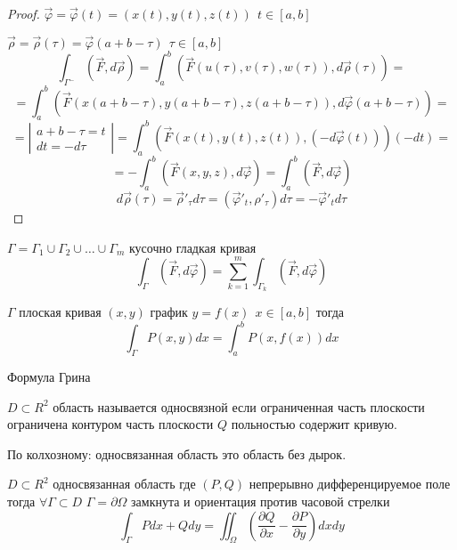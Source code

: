 \begin{proof}
  $\vec \varphi = \vec \varphi(t) = (x(t), y(t), z(t)) ~~ t \in [a,b]$

  $\vec \rho = \vec \rho (\tau) = \vec \varphi(a+b-\tau) ~~ \tau \in [a,b]$
  $$
  \int_{\Gamma^-}(\vec F, d\vec \rho) = \int_a^b (\vec F(u(\tau), v(\tau),
  w(\tau)), d\vec \rho (\tau)) =
  $$
  $$
  = \int_a^b (\vec F(x(a+b-\tau),y(a+b-\tau),z(a+b-\tau)),
  d\vec \varphi(a+b-\tau))
  =
  $$
  $$
  =
  \left|
    \begin{array}{l}
      a+b-\tau = t \\
      dt = -d\tau
    \end{array}
  \right|
  = \int_a^b (\vec F(x(t), y(t), z(t)), (-d\vec \varphi(t)))(-dt) =
  $$
  $$
  = - \int_a^b (\vec F(x,y,z), d \vec \varphi)
  = \int_a^b (\vec F, d \vec \varphi)
  $$
  $$
  d\vec \rho(\tau) = \vec \rho'_{\tau} d\tau = (\vec \varphi'_t, \rho'_{\tau})
  d\tau = -\vec \varphi'_t d\tau
  $$
\end{proof}

\begin{theorem}
  $\Gamma = \Gamma_1 \cup \Gamma_2 \cup \ldots \cup \Gamma_m$ кусочно гладкая
  кривая
  $$
  \int_{\Gamma} (\vec F, d\vec \varphi) = \sum_{k=1}^m \int_{\Gamma_k}
  (\vec F, d\vec \varphi)
  $$
\end{theorem}

\begin{theorem}
  $\Gamma$ плоская кривая $(x,y)$ график $y = f(x) ~~ x \in [a,b]$ тогда
  $$
  \int_{\Gamma} P(x,y)dx = \int_a^b P(x, f(x))dx
  $$
\end{theorem}

\begin{title}[\Large]
  Формула Грина
\end{title}

\begin{define}
  $D \subset R^2$ область называется односвязной если ограниченная часть
  плоскости ограничена контуром часть плоскости $Q$ польностью содержит кривую.

  По колхозному: односвязанная область это область без дырок.
\end{define}

\begin{block}
  $D \subset R^2$ односвязанная область где $(P,Q)$ непрерывно дифференцируемое
  поле тогда $\forall \Gamma \subset D$ $\Gamma = \partial \Omega$ замкнута и
  ориентация против часовой стрелки
  $$
  \int_{\Gamma} Pdx + Qdy = \iint_{\Omega}  \left( \frac{\partial Q}{\partial x}
  - \frac{\partial P}{\partial y} \right) dxdy
  $$
\end{block}

